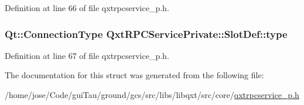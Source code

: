 Definition at line 66 of file qxtrpcservice\-\_\-p.\-h.

\hypertarget{struct_qxt_r_p_c_service_private_1_1_slot_def_a6f2cb1ed2eec6558038a6e49ba50bd5f}{
\subsubsection[{type}]{\setlength{\rightskip}{0pt plus 5cm}Qt\-::\-Connection\-Type Qxt\-R\-P\-C\-Service\-Private\-::\-Slot\-Def\-::type}}\label{struct_qxt_r_p_c_service_private_1_1_slot_def_a6f2cb1ed2eec6558038a6e49ba50bd5f}


Definition at line 67 of file qxtrpcservice\-\_\-p.\-h.



The documentation for this struct was generated from the following file\-:\begin{DoxyCompactItemize}
\item 
/home/jose/\-Code/gui\-Tau/ground/gcs/src/libs/libqxt/src/core/\hyperlink{qxtrpcservice__p_8h}{qxtrpcservice\-\_\-p.\-h}\end{DoxyCompactItemize}
